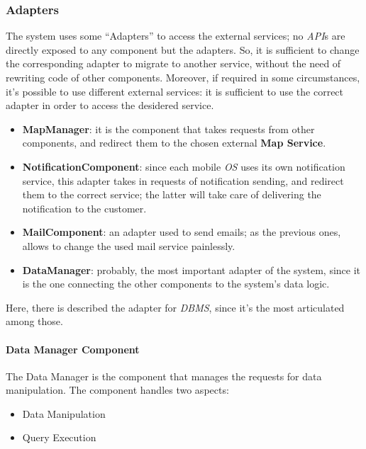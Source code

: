 \documentclass{article}
\begin{document}
		\subsubsection{Adapters}
		The system uses some “Adapters” to access the external services; no \emph{API}s are directly exposed to any component but the adapters. So, it is sufficient to change the corresponding adapter to migrate to another service, without the need of rewriting code of other components. Moreover, if required in some circumstances, it’s possible to use different external services: it is sufficient to use the correct adapter in order to access the desidered service.
		
		\begin{itemize}
			\item {\bfseries MapManager}: it is the component that takes requests from other components, and redirect them to the chosen external {\bfseries Map Service}.
			
			\item {\bfseries NotificationComponent}: since each mobile \emph{OS} uses its own notification service, this adapter takes in requests of notification sending, and redirect them to the correct service; the latter will take care of delivering the notification to the customer.
			
			\item {\bfseries MailComponent}: an adapter used to send emails; as the previous ones, allows to change the used mail service painlessly.
			
			\item {\bfseries DataManager}: probably, the most important adapter of the system, since it is the one connecting the other components to the system’s data logic. 
		\end{itemize}
		
		
		Here, there is described the adapter for \emph{DBMS}, since it’s the most articulated among those.
		
			\paragraph{Data Manager Component}
				The Data Manager is the component that manages the requests for data manipulation. The component handles two aspects:
				
				\begin{itemize}
					\item Data Manipulation
					\item Query Execution
				\end{itemize}
			
\end{document}
